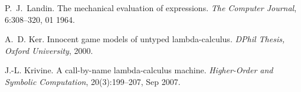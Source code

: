 \documentclass[xchauthor,chkrefs,GCNS,amsmath,amsthm,rotating,leaveRGB]{tcsg}
\theoremstyle{plain}
\theoremstyle{definition}
\begin{document}
\begin{backmatter}
\begin{thebibliography}{}
\begin{bsubitem}
\begin{bcontribution}%
\end{bcontribution}
\begin{bhost}
\begin{bissue}
\end{bissue}
\end{bhost}
\end{bsubitem}
%
\OrigBibText
P.~J.~Landin.
 The mechanical evaluation of expressions.
 \emph{The Computer Journal}, 6:308--320, 01 1964.
\endOrigBibText
{}%
\endbibitem

\begin{bsubitem}
\begin{bcontribution}%
\end{bcontribution}
\prnsep{,\ }
\begin{bhost}
\begin{bbook}[class=report]
\end{bbook}
\end{bhost}
\end{bsubitem}
%
\OrigBibText
A.~D. Ker.
 Innocent game models of untyped lambda-calculus.
 \emph{DPhil Thesis, Oxford University}, 2000.
\endOrigBibText
{}%
\endbibitem

\begin{bsubitem}
\begin{bcontribution}%
\end{bcontribution}
\begin{bhost}
\begin{bissue}
\end{bissue}
\end{bhost}
\end{bsubitem}
%
\OrigBibText
J.-L. Krivine.
 A call-by-name lambda-calculus machine.
 \emph{Higher-Order and Symbolic Computation}, 20(3):199--207, Sep
 2007.
\endOrigBibText
{}%
\endbibitem


\end{thebibliography}
\end{backmatter}
\end{document}

